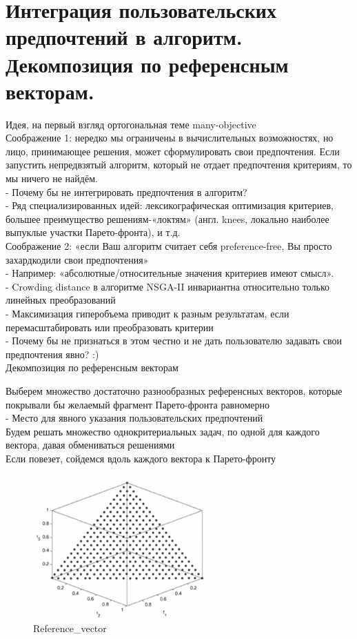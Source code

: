 \section{Интеграция пользовательских предпочтений в алгоритм. Декомпозиция по референсным векторам.}
Идея, на первый взгляд ортогональная теме many-objective\\
Соображение 1: нередко мы ограничены в вычислительных возможностях, но
лицо, принимающее решения, может сформулировать свои предпочтения. Если запустить непредвзятый алгоритм, который не отдает предпочтения критериям, то мы ничего не найдём.\\
- Почему бы не интегрировать предпочтения в алгоритм? \\
- Ряд специализированных идей: лексикографическая оптимизация критериев,
большее преимущество решениям-«локтям» (англ. knees, локально наиболее
выпуклые участки Парето-фронта), и т.д.\\
Соображение 2: «если Ваш алгоритм считает себя preference-free, Вы просто
захардкодили свои предпочтения»\\
- Например: «абсолютные/относительные значения критериев имеют смысл». \\
- Crowding distance в алгоритме NSGA-II инвариантна относительно только
линейных преобразований\\
- Максимизация гиперобъема приводит к разным результатам, если
перемасштабировать или преобразовать критерии\\
- Почему бы не признаться в этом честно и не дать пользователю задавать свои
предпочтения явно? :)\\

Декомпозиция по референсным векторам

Выберем множество достаточно разнообразных референсных векторов,
которые покрывали бы желаемый фрагмент Парето-фронта равномерно\\
- Место для явного указания пользовательских предпочтений\\
Будем решать множество однокритериальных задач, по одной для каждого
вектора, давая обмениваться решениями\\
Если повезет, сойдемся вдоль каждого вектора к Парето-фронту

\begin{figure}[!ht]

\begin{center}
    \includegraphics[width=0.3\linewidth]{images/Reference_vector.PNG}
    \caption{Reference_vector}
    \label{fig:mpr}
    
\end{center}

\end{figure}
